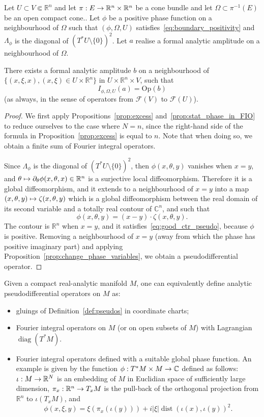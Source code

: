 \documentclass[AHL,Unicode,longabstracts,published]{cedram}
\DeclareMathOperator{\diag}{diag}
\DeclareMathOperator{\dist}{dist}
\newcommand{\Opp}{\mathrm{Op}}
\newcommand{\clF}{\mathcal{F}}
\newcommand\1{\mathds{1}}
\newcommand{\R}{\mathbb{R}}
\newcommand{\C}{\mathbb{C}}
\renewcommand*{\to}{\mathchoice{\longrightarrow}{\rightarrow}{\rightarrow}{\rightarrow}}
\let\oldmapsto\mapsto
\renewcommand*{\mapsto}{\mathchoice{\longmapsto}{\oldmapsto}{\oldmapsto}{\oldmapsto}}
\begin{document}
\begin{prop}\label{prop:Kuranishi}
Let $U\subset V\Subset \R^n$ and let $\pi:E\to \R^n\times \R^n$ be a cone bundle and let $\Omega\subset \pi^{-1}(E)$ be an open compact cone.. Let $\phi$ be a positive phase function on a neighbourhood of $\Omega$ such that $(\phi,\Omega,U)$ satisfies~\eqref{eq:boundary_positivity} and $\Lambda_{\phi}$ is the diagonal of $(T^*U\setminus \{0\})^2$. Let $a$ realise a formal analytic amplitude on a neighbourhood of $\Omega$.

There exists a formal analytic amplitude $b$ on a neighbourhood of $\{(x,\xi,x),(x,\xi)\in U\times \R^n\}$ in $U\times \R^n\times V$, such that
\[
I_{\phi,\Omega,U}(a)=\Opp(b)
\]
(as always, in the sense of operators from $\clF(V)$ to $\clF(U)$).
\end{prop}
\begin{proof}
We first apply Propositions~\ref{prop:excess} and~\ref{prop:stat_phase_in_FIO} to reduce ourselves to the case where $N=n$, since the right-hand side of the formula in Proposition~\ref{prop:excess} is equal to $n$. Note that when doing so, we obtain a finite sum of Fourier {integral operators}.

Since $\Lambda_{\phi}$ is the diagonal of $(T^*U\setminus \{0\})^2$, then $\phi(x,\theta,y)$ vanishes when $x=y$, and $\theta\mapsto
\partial_{\theta}\phi(x,\theta,x)\in \R^n$ is a surjective local diffeomorphism. Therefore it is a global diffeomorphism, and it extends to a neighbourhood of $x=y$ into a map $(x,\theta,y)\mapsto
\zeta(x,\theta,y)$ which is a global diffeomorphism between the real domain of its second variable and a totally real contour of $\C^n$, and such that
\[
\phi(x,\theta,y)=(x-y)\cdot \zeta(x,\theta,y).
\]
The contour is $\R^n$ when $x=y$, and it satisfies~\eqref{eq:good_ctr_pseudo}, because $\phi$ is positive. Removing a neighbourhood of $x=y$ (away from which the phase has positive imaginary part) and applying Proposition~\ref{prop:change_phase_variables}, we obtain a pseudodifferential operator.
\end{proof}

\pagebreak
Given a compact real-analytic manifold $M$, one can equivalently define analytic pseudodifferential operators on $M$ as:
\begin{itemize}
\item gluings of Definition~\ref{def:pseudos} in coordinate charts;
\item Fourier integral operators on $M$ (or on open subsets of $M$) with Lagrangian $\diag(T^*M)$.
\item Fourier integral operators defined with a suitable global phase function. An example is given by the function $\phi:T^*M\times M\to
\C$ defined as follows: $\iota:M\to \R^N$ is an embedding of $M$ in Euclidian space of sufficiently large dimension, $\pi_x:\R^n\to T_xM$ is the pull-back of the orthogonal projection from $\R^n$ to $\iota(T_xM)$, and
\[
\phi(x,\xi,y)=\xi(\pi_x(\iota(y)))+i|\xi|\dist(\iota(x),\iota(y))^2.
\]
\end{itemize}
\end{document}
